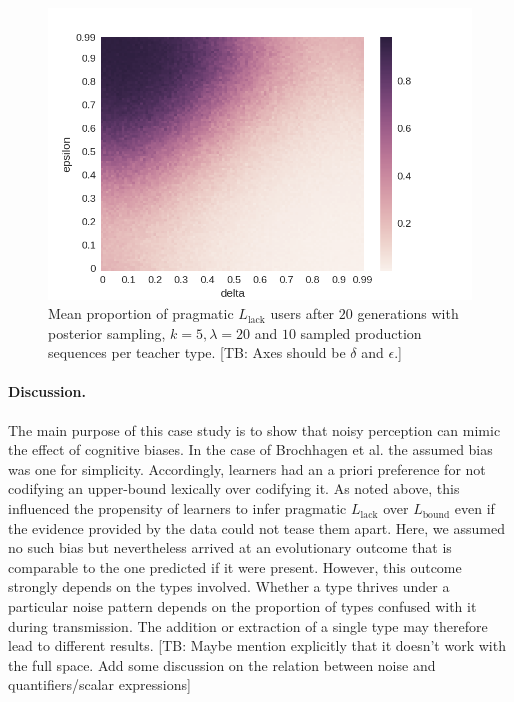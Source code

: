 \documentclass[10pt,a4paper]{article}
\newcommand{\tb}[1]{\textcolor[rgb]{.8,.33,.0}{[TB: #1]}}%
\begin{document}
\begin{figure}[ht]
\centering
    \includegraphics[scale=0.5]{../code/plots/quantifiers-posterior-sampling-k5.png}
  \caption{Mean proportion of pragmatic $L_{\text{lack}}$ users after $20$ generations with posterior sampling, $k = 5, \lambda = 20$ and $10$ sampled production sequences per teacher type. \tb{Axes should be $\delta$ and $\epsilon$.}}
  \label{fig:quant}
\end{figure}


\paragraph{Discussion.} The main purpose of this case study is to show that noisy perception can mimic the effect of cognitive biases. In the case of Brochhagen et al. the assumed bias was one for simplicity. Accordingly, learners had an a priori preference for not codifying an upper-bound lexically over codifying it. As noted above, this influenced the propensity of learners to infer pragmatic $L_{\text{lack}}$ over $L_{\text{bound}}$ even if the evidence provided by the data could not tease them apart. Here, we assumed no such bias but nevertheless arrived at an evolutionary outcome that is comparable to the one predicted if it were present. However, this outcome strongly depends on the types involved. Whether a type thrives under a particular noise pattern depends on the proportion of types confused with it during transmission. The addition or extraction of a single type may therefore lead to different results. \tb{Maybe mention explicitly that it doesn't work with the full space. Add some discussion on the relation between noise and quantifiers/scalar expressions}
\end{document}
